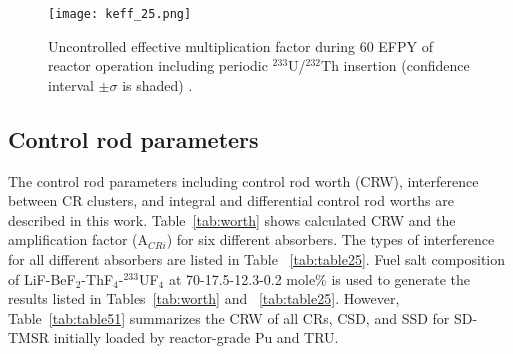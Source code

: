 \begin{figure}
	\centering
	\texttt{[image: keff\_25.png]}
	\vspace{-0.5in}
	\caption{Uncontrolled effective multiplication factor during 60 EFPY of reactor operation
		including periodic $^{233}$U/$^{232}$Th insertion (confidence interval $\pm\sigma$ is shaded) \cite{ashraf2020whole}.} 
	\label{fig:keff_25}
\end{figure}

\subsection{Control rod parameters}

The control rod parameters including control rod worth (CRW), interference 
between CR clusters, and integral and differential control rod worths are 
described in this work. Table~\ref{tab:worth} shows calculated CRW and the amplification 
factor (A$_{CRi}$) for six different 
absorbers. The types of interference for all different 
absorbers are listed in Table ~\ref{tab:table25}. Fuel salt composition of LiF-BeF$_2$-ThF$_4$-$^{233}$UF$_4$ at 70-17.5-12.3-0.2 mole\% is used to generate the results listed in Tables~\ref{tab:worth} and ~\ref{tab:table25}. However, Table~\ref{tab:table51} summarizes the CRW of all CRs, CSD, and SSD for SD-TMSR initially loaded by reactor-grade Pu and TRU. 

